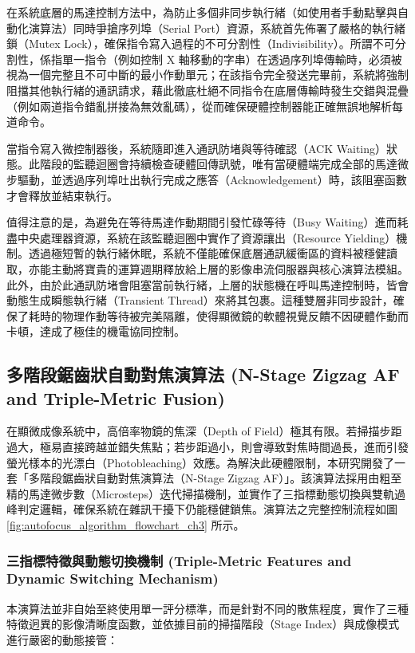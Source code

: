在系統底層的馬達控制方法中，為防止多個非同步執行緒（如使用者手動點擊與自動化演算法）同時爭搶序列埠（Serial Port）資源，系統首先佈署了嚴格的執行緒鎖（Mutex Lock），確保指令寫入過程的不可分割性（Indivisibility）。所謂不可分割性，係指單一指令（例如控制 X 軸移動的字串）在透過序列埠傳輸時，必須被視為一個完整且不可中斷的最小作動單元；在該指令完全發送完畢前，系統將強制阻擋其他執行緒的通訊請求，藉此徹底杜絕不同指令在底層傳輸時發生交錯與混疊（例如兩道指令錯亂拼接為無效亂碼），從而確保硬體控制器能正確無誤地解析每道命令。

當指令寫入微控制器後，系統隨即進入通訊防堵與等待確認（ACK Waiting）狀態。此階段的監聽迴圈會持續檢查硬體回傳訊號，唯有當硬體端完成全部的馬達微步驅動，並透過序列埠吐出執行完成之應答（Acknowledgement）時，該阻塞函數才會釋放並結束執行。

值得注意的是，為避免在等待馬達作動期間引發忙碌等待（Busy Waiting）進而耗盡中央處理器資源，系統在該監聽迴圈中實作了資源讓出（Resource Yielding）機制。透過極短暫的執行緒休眠，系統不僅能確保底層通訊緩衝區的資料被穩健讀取，亦能主動將寶貴的運算週期釋放給上層的影像串流伺服器與核心演算法模組。此外，由於此通訊防堵會阻塞當前執行緒，上層的狀態機在呼叫馬達控制時，皆會動態生成瞬態執行緒（Transient Thread）來將其包裹。這種雙層非同步設計，確保了耗時的物理作動等待被完美隔離，使得顯微鏡的軟體視覺反饋不因硬體作動而卡頓，達成了極佳的機電協同控制。

\subsection{多階段鋸齒狀自動對焦演算法 (N-Stage Zigzag AF and Triple-Metric Fusion)}

在顯微成像系統中，高倍率物鏡的焦深（Depth of Field）極其有限。若掃描步距過大，極易直接跨越並錯失焦點；若步距過小，則會導致對焦時間過長，進而引發螢光樣本的光漂白（Photobleaching）效應。為解決此硬體限制，本研究開發了一套「多階段鋸齒狀自動對焦演算法（N-Stage Zigzag AF）」。該演算法採用由粗至精的馬達微步數（Microsteps）迭代掃描機制，並實作了三指標動態切換與雙軌過峰判定邏輯，確保系統在雜訊干擾下仍能穩健鎖焦。演算法之完整控制流程如圖 \ref{fig:autofocus_algorithm_flowchart_ch3} 所示。

\subsubsection{三指標特徵與動態切換機制 (Triple-Metric Features and Dynamic Switching Mechanism)}

本演算法並非自始至終使用單一評分標準，而是針對不同的散焦程度，實作了三種特徵迥異的影像清晰度函數，並依據目前的掃描階段（Stage Index）與成像模式進行嚴密的動態接管：


